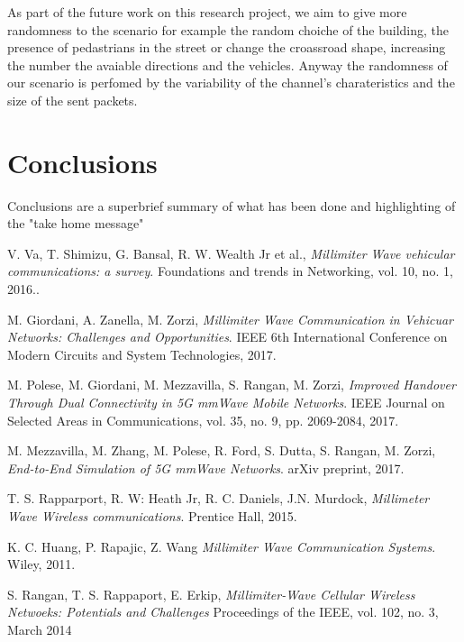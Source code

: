 \documentclass[conference,10pt]{IEEEtran}
\begin{document}
As part of the future work on this research project, we aim to give more randomness to the scenario for example the random choiche of the building, the presence of pedastrians in the street or change the croassroad shape, increasing the number the avaiable directions and the vehicles. Anyway the randomness of our scenario is perfomed by the variability of the channel's charateristics and the size of the sent packets.
\section{Conclusions}\label{sec:conclusion}
Conclusions are a superbrief summary of what has been done and highlighting of the "take home message"



\begin{thebibliography}{15}
	
	V. Va, T. Shimizu, G. Bansal, R. W. Wealth Jr et al.,
	\textit{Millimiter Wave vehicular communications: a survey}. 
	Foundations and trends in Networking, vol. 10, no. 1, 2016..
	
	M. Giordani, A. Zanella, M. Zorzi,
	\textit{Millimiter Wave Communication in Vehicuar Networks: Challenges and Opportunities}. 
	IEEE 6th International Conference on Modern Circuits and System Technologies, 2017.
	
	M. Polese, M. Giordani, M. Mezzavilla, S. Rangan, M. Zorzi,
	\textit{Improved Handover Through Dual Connectivity in 5G mmWave Mobile Networks}. 
	IEEE Journal on Selected Areas in Communications, vol. 35, no. 9, pp. 2069-2084, 2017.
	
	M. Mezzavilla, M. Zhang, M. Polese, R. Ford, S. Dutta, S. Rangan, M. Zorzi,
	\textit{End-to-End Simulation of 5G mmWave Networks}. 
	arXiv preprint, 2017.
	
	T. S. Rapparport, R. W: Heath Jr, R. C. Daniels, J.N. Murdock,
	\textit{Millimeter Wave Wireless communications}.
	Prentice Hall, 2015.
	
	K. C. Huang, P. Rapajic, Z. Wang
	\textit{Millimiter Wave Communication Systems}.
	Wiley, 2011.
	
	S. Rangan, T. S. Rappaport, E. Erkip,
	\textit{Millimiter-Wave Cellular Wireless Netwoeks: Potentials and Challenges}
	Proceedings of the IEEE, vol. 102, no. 3, March 2014
	
	
	
\end{thebibliography}
\end{document}
